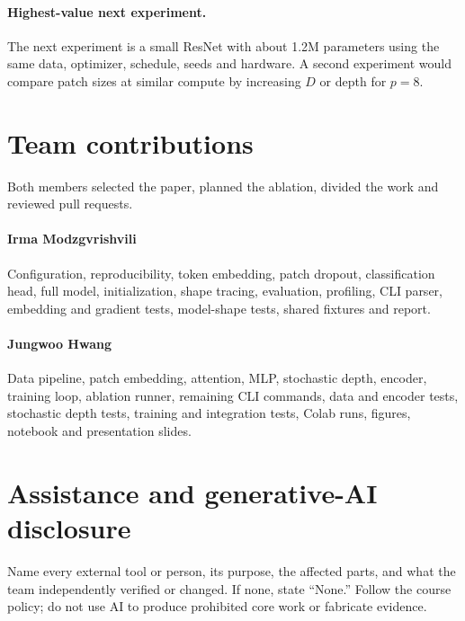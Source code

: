\documentclass{article}
\begin{document}
\paragraph{Highest-value next experiment.}
The next experiment is a small ResNet with about 1.2M parameters using the same data, optimizer, schedule, seeds and hardware. A second experiment would compare patch sizes at similar compute by increasing $D$ or depth for $p=8$.


\section{Team contributions}

\label{sec:contributions}

Both members selected the paper, planned the ablation, divided the work and reviewed pull requests.

\paragraph{Irma Modzgvrishvili} Configuration, reproducibility, token embedding, patch dropout, classification head, full model, initialization, shape tracing, evaluation, profiling, CLI parser, embedding and gradient tests, model-shape tests, shared fixtures and report.

\paragraph{Jungwoo Hwang} Data pipeline, patch embedding, attention, MLP, stochastic depth, encoder, training loop, ablation runner, remaining CLI commands, data and encoder tests, stochastic depth tests, training and integration tests, Colab runs, figures, notebook and presentation slides.


\section{Assistance and generative-AI disclosure}

Name every external tool or person, its purpose, the affected parts, and what the team independently verified or changed. If none, state ``None.'' Follow the course policy; do not use AI to produce prohibited core work or fabricate evidence.

\clearpage


\clearpage
\appendix
\end{document}
